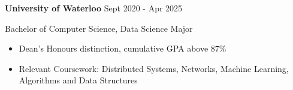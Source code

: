 \textbf{University of Waterloo} \hfill Sept 2020 - Apr 2025\par
Bachelor of Computer Science, Data Science Major \par
\begin{itemize}
  \item Dean's Honours distinction, cumulative GPA above 87\%
  \item Relevant Coursework: Distributed Systems, Networks, Machine Learning, Algorithms and Data Structures
\end{itemize}
\vspace{0.1cm} \par
